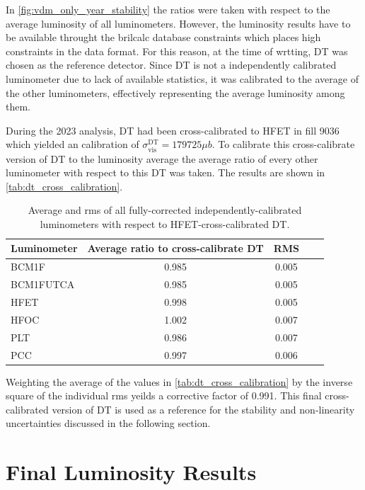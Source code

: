 In \autoref{fig:vdm_only_year_stability} the ratios were taken with respect to the average luminosity of all luminometers. However, the luminosity results have to be available throught the brilcalc database constraints which places high constraints in the data format. For this reason, at the time of wrtting, DT was chosen as the reference detector. Since DT is not a independently calibrated luminometer due to lack of available statistics, it was calibrated to the average of the other luminometers, effectively representing the average luminosity among them.

During the 2023 analysis, DT had been cross-calibrated to HFET in fill 9036 which yielded an calibration of $\sigma^{\text{DT}}_{\mathrm{vis}} = 179725 \mu b$. To calibrate this cross-calibrate version of DT to the luminosity average the average ratio of every other luminometer with respect to this DT was taken. The results are shown in \autoref{tab:dt_cross_calibration}.

\begin{table}[!htb]
	\caption{
		Average and rms of all fully-corrected independently-calibrated luminometers with respect to HFET-cross-calibrated DT. 
	}
	
	\label{tab:dt_cross_calibration}
	\centering
	\begin{tabular}{lcccc}
		\hline
		Luminometer & Average ratio to cross-calibrate DT & RMS \\
		\hline
		BCM1F     & 0.985 & 0.005 \\
		BCM1FUTCA & 0.985 & 0.005 \\
		HFET      & 0.998 & 0.005 \\
		HFOC      & 1.002 & 0.007 \\
		PLT       & 0.986 & 0.007 \\
		PCC       & 0.997 & 0.006 \\
		\hline
	\end{tabular}
\end{table}

Weighting the average of the values in \autoref{tab:dt_cross_calibration} by the inverse square of the individual rms yeilds a corrective factor of 0.991. This final cross-calibrated version of DT is used as a reference for the stability and non-linearity uncertainties discussed in the following section.

\section{Final Luminosity Results}

